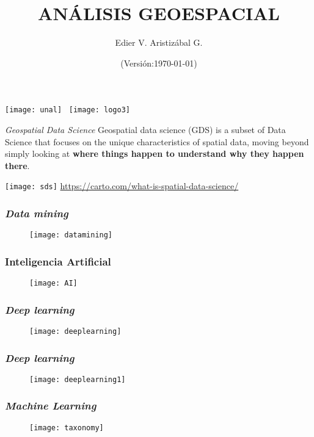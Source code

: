 \documentclass[14pt]{beamer}
\title[Clasificación de Imágenes]{ANÁLISIS GEOESPACIAL}
\author[Edier Aristizábal]{Edier V. Aristizábal G.}
\institute{\emph{evaristizabalg@unal.edu.co}}
\date{\tiny{(Versión:\today)}}
\begin{document}
\begin{frame}
\titlepage
\centering
	\texttt{[image: unal]}\hspace*{4.75cm}~%
   	\texttt{[image: logo3]}
\end{frame}
\begin{frame}
\begin{block}{\emph{Geospatial Data Science}}
\small{Geospatial data science (GDS) is a subset of Data Science that focuses on the unique characteristics of spatial data, moving beyond simply looking at \textbf{where things happen to understand why they happen there}}.
\end{block}
\centering
	\texttt{[image: sds]}\vfill
\tiny{\url{https://carto.com/what-is-spatial-data-science/}}
\end{frame}
 \begin{frame}
 \frametitle{\emph{Data mining}}
  \begin{figure}
    \centering
    \texttt{[image: datamining]}
  \end{figure}
\end{frame}
 \begin{frame}
 \frametitle{Inteligencia Artificial}
  \begin{figure}
    \centering
    \texttt{[image: AI]}
  \end{figure}
\end{frame}
 \begin{frame}
 \frametitle{\emph{Deep learning}}
  \begin{figure}
    \centering
    \texttt{[image: deeplearning]}
  \end{figure}
\end{frame}
 \begin{frame}
 \frametitle{\emph{Deep learning}}
  \begin{figure}
    \centering
    \texttt{[image: deeplearning1]}
  \end{figure}
\end{frame}
 \begin{frame}
 \frametitle{\emph{Machine Learning}}
  \begin{figure}
    \centering
    \texttt{[image: taxonomy]}
  \end{figure}
\end{frame}
\end{document}

